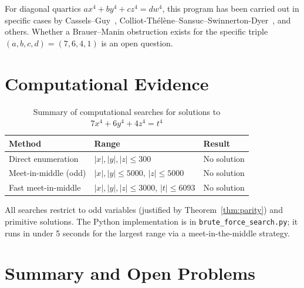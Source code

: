 \documentclass[12pt, a4paper]{article}
\theoremstyle{definition}
\begin{document}
For diagonal quartics $ax^4+by^4+cz^4=dw^4$, this program has been carried out in
specific cases by Cassels--Guy~\cite{CasselsGuy1966}, Colliot-Thélène--Sansuc--Swinnerton-Dyer~\cite{CTSanSw1987}, and others.  Whether a Brauer--Manin obstruction exists for
the specific triple $(a,b,c,d)=(7,6,4,1)$ is an open question.

\section{Computational Evidence}

\begin{table}[h]
\centering
\caption{Summary of computational searches for solutions to $7x^4+6y^4+4z^4=t^4$}
\label{tab:search}
\begin{tabular}{lll}
\toprule
Method & Range & Result \\
\midrule
Direct enumeration & $|x|,|y|,|z| \leq 300$ & No solution \\
Meet-in-middle (odd) & $|x|,|y| \leq 5000$, $|z| \leq 5000$ & No solution \\
Fast meet-in-middle & $|x|,|y|,|z| \leq 3000$, $|t| \leq 6093$ & No solution \\
\bottomrule
\end{tabular}
\end{table}

All searches restrict to odd variables (justified by Theorem~\ref{thm:parity})
and primitive solutions.  The Python implementation is in \texttt{brute\_force\_search.py};
it runs in under 5 seconds for the largest range via a meet-in-the-middle strategy.

\section{Summary and Open Problems}
\end{document}

